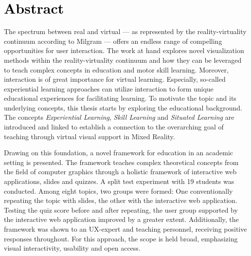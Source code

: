 %





\chapter*{\textcolor{black}{Abstract}}
\label{sec:abstract}
\vspace*{-10mm}


The spectrum between real and virtual --- as represented by the reality-virtuality continuum according to Milgram --- offers an endless range of compelling opportunities for user interaction.
The work at hand explores novel visualization methods within the reality-virtuality continuum and how they can be leveraged to teach complex concepts in education and motor skill learning.
Moreover, interaction is of great importance for virtual learning.
Especially, so-called experiential learning approaches can utilize interaction to form unique educational experiences for facilitating learning.
To motivate the topic and its underlying concepts, this thesis starts by exploring the educational background.
The concepts \emph{Experiential Learning}, \emph{Skill Learning} and \emph{Situated Learning} are introduced and linked to establish a connection to the overarching goal of teaching through virtual visual support in Mixed Reality.

Drawing on this foundation, a novel framework for education in an academic setting is presented.
The framework teaches complex theoretical concepts from the field of computer graphics through a holistic framework of interactive web applications, slides and quizzes.
A split test experiment with 19 students was conducted.
Among eight topics, two groups were formed: One conventionally repeating the topic with slides, the other with the interactive web application.
Testing the quiz score before and after repeating, the user group supported by the interactive web application improved by a greater extent.
Additionally, the framework was shown to an UX-expert and teaching personnel, receiving positive responses throughout.
For this approach, the scope is held broad, emphasizing visual interactivity, usability and open access.

